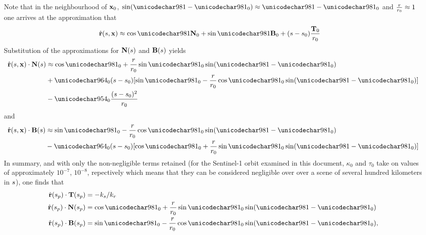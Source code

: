 Note that in the neighbourhood of $\mathbf{x}_0$, $\sin(\targetdepression-\targetdepressionz)\approx\targetdepression-\targetdepressionz$ and $\frac{r}{r_0}\approx 1$ one arrives at the approximation that
\begin{equation}
\begin{split}
 \uRangeVectorParm &\approx \cos\targetdepression\vct{N}_0 + \sin\targetdepression\vct{B}_0 + (\parm-\parm_0)\frac{\vct{T}_0}{\targetrangez}
 \end{split}
\end{equation}
Substitution of the approximations for $\mathbf{N}(s)$ and $\mathbf{B}(s)$ yields
\begin{equation}
\begin{split}
 \uRangeVectorParm\cdot\vct{N}(\parm)&\approx\cos\targetdepressionz + \frac{\targetrange}{\targetrangez}\sin\targetdepressionz\sin(\targetdepression-\targetdepressionz)\\
 &+ \tau_0(\parm-\parm_0)[\sin\targetdepressionz - \frac{\targetrange}{\targetrangez}\cos\targetdepressionz\sin(\targetdepression-\targetdepressionz)]\\
 &-\kappa_0\frac{(\parm-\parm_0)^2}{\targetrangez}
\end{split}
 \end{equation}
and
\begin{equation}
\begin{split}
 \uRangeVectorParm\cdot\vct{B}(\parm)&\approx\sin\targetdepressionz - \frac{\targetrange}{\targetrangez}\cos\targetdepressionz\sin(\targetdepression-\targetdepressionz)\\
 &- \tau_0(\parm-\parm_0)[\cos\targetdepressionz + \frac{\targetrange}{\targetrangez}\sin\targetdepressionz\sin(\targetdepression-\targetdepressionz)]
\end{split}
\end{equation} 
In summary, and with only the non-negligible terms retained (for the Sentinel-1 orbit examined in this document, $\kappa_0$ and $\tau_0$ take on values of approximately $10^{-7}$, $10^{-8}$, repectively which means that they can be considered negligible over over a scene of several hundred kilometers in $s$), one finds that
\begin{align}
 \vhat{\range}(\stationaryparm)\cdot\vct{T}(\stationaryparm) &= -\kparm/\kr\label{eq:ender}\\
 \vhat{\range}(\stationaryparm)\cdot\vct{N}(\stationaryparm) &= \cos\targetdepressionz + \frac{\targetrange}{\targetrangez}\sin\targetdepressionz\sin(\targetdepression-\targetdepressionz)\label{eq:cos}\\
 \vhat{\range}(\stationaryparm)\cdot\vct{B}(\stationaryparm) &= \sin\targetdepressionz - \frac{\targetrange}{\targetrangez}\cos\targetdepressionz\sin(\targetdepression-\targetdepressionz),\label{eq:sin}
\end{align}
